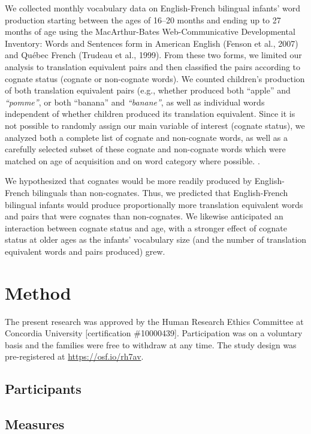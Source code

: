 \documentclass[
  english,
  ,man,floatsintext]{apa6}
\begin{document}
We collected monthly vocabulary data on English-French bilingual infants' word production starting between the ages of 16--20 months and ending up to 27 months of age using the MacArthur-Bates Web-Communicative Developmental Inventory: Words and Sentences form in American English (Fenson et al., 2007) and Québec French (Trudeau et al., 1999). From these two forms, we limited our analysis to translation equivalent pairs and then classified the pairs according to cognate status (cognate or non-cognate words). We counted children's production of both translation equivalent pairs (e.g., whether produced both ``apple'' and \emph{``pomme''}, or both ``banana'' and \emph{``banane''}, as well as individual words independent of whether children produced its translation equivalent. Since it is not possible to randomly assign our main variable of interest (cognate status), we analyzed both a complete list of cognate and non-cognate words, as well as a carefully selected subset of these cognate and non-cognate words which were matched on age of acquisition and on word category where possible. .

We hypothesized that cognates would be more readily produced by English-French bilinguals than non-cognates. Thus, we predicted that English-French bilingual infants would produce proportionally more translation equivalent words and pairs that were cognates than non-cognates. We likewise anticipated an interaction between cognate status and age, with a stronger effect of cognate status at older ages as the infants' vocabulary size (and the number of translation equivalent words and pairs produced) grew.

\hypertarget{method}{%
\section{Method}\label{method}}

The present research was approved by the Human Research Ethics Committee at Concordia University {[}certification \#10000439{]}. Participation was on a voluntary basis and the families were free to withdraw at any time. The study design was pre-registered at \url{https://osf.io/rh7av}.

\hypertarget{participants}{%
\subsection{Participants}\label{participants}}

\hypertarget{measures}{%
\subsection{Measures}\label{measures}}
\end{document}
